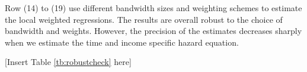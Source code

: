 \documentclass[reviewmode,AEJ]{AEA}
\begin{document}
Row (14) to (19) use different bandwidth sizes and weighting schemes to estimate the local weighted regressions. The results are overall robust to the choice of bandwidth and weights. However, the precision of the estimates decreases sharply when we estimate the time and income specific hazard equation.

\begin{center}
	[Insert Table \ref{tb:robustcheck} here]
\end{center}


\end{document}
